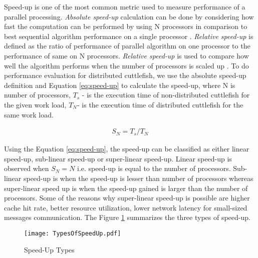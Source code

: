 Speed-up is one of the most common metric used to measure performance of a parallel processing. \textit{Absolute speed-up} calculation can be done by considering how fast the computation can be performed by using N processors in comparison to best sequential algorithm performance on a single processor \cite{Speedup}. \textit{Relative speed-up }is defined as the ratio of performance of parallel algorithm on one processor to the performance of same on N processors. \textit{Relative speed-up} is used to compare how well the algorithm performs when the number of processors is scaled up \cite{Speedup}. To do performance evaluation for distributed cuttlefish, we use the absolute speed-up definition and Equation \ref{eq:speed-up} to calculate the speed-up, where N is number of processors, \begin{math} T_{s} \end{math} - is the execution time of non-distributed cuttlefish for the given work load, \begin{math} T_{N}\end{math}- is the execution time of distributed cuttlefish for the same work load.

\begin{equation}
\label{eq:speed-up}
\begin{aligned}
S_{N} = T_{s}/T_{N}
\end{aligned}
\end{equation}

Using the Equation \ref{eq:speed-up}, the speed-up can be classified as either linear speed-up, sub-linear speed-up or super-linear speed-up. Linear speed-up is observed when \begin{math}S_{N}=N \end{math} i.e. speed-up is equal to the number of processors. Sub-linear speed-up is when the speed-up is lesser than number of processors whereas super-linear speed up is when the speed-up gained is larger than the number of processors. Some of the reasons why super-linear speed-up is possible are higher cache hit rate, better resource utilization, lower network latency for small-sized messages communication. The Figure \ref{fig:TypesOfSpeedUp} summarizes the three types of speed-up.\newline 

\begin{figure}[t]
\centering
\texttt{[image: TypesOfSpeedUp.pdf]}
\caption{Speed-Up Types}
\label{fig:TypesOfSpeedUp}
\end{figure}

